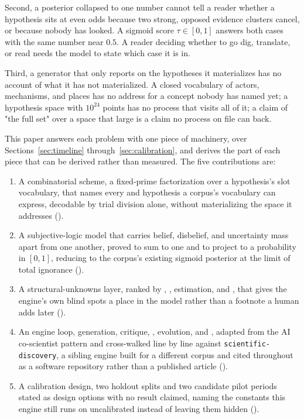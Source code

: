 \documentclass[11pt]{article}
\begin{document}
Second, a posterior collapsed to one number cannot tell a reader whether
a hypothesis sits at even odds because two strong, opposed evidence
clusters cancel, or because nobody has looked. A sigmoid score $\tau \in
[0,1]$ answers both cases with the same number near $0.5$. A reader
deciding whether to go dig, translate, or read needs the model to state
which case it is in.

Third, a generator that only reports on the hypotheses it materializes has
no account of what it has not materialized. A closed vocabulary of actors,
mechanisms, and places has no address for a concept nobody has named yet;
a hypothesis space with $10^{24}$ points has no process that visits all of
it; a claim of "the full set" over a space that large is a claim no
process on file can back.

This paper answers each problem with one piece of machinery, over
Sections~\ref{sec:timeline} through~\ref{sec:calibration}, and derives the
part of each piece that can be derived rather than measured. The five
contributions are:

\begin{enumerate}
  \item A combinatorial  scheme, a fixed-prime
    factorization over a hypothesis's slot vocabulary, that names every
     and
     hypothesis a corpus's vocabulary
    can express, decodable by trial division alone, without materializing
    the space it addresses ().
  \item A subjective-logic  model that carries
    belief, disbelief, and uncertainty mass apart from one another, proved
    to sum to one and to project to a probability in $[0,1]$, reducing to
    the corpus's existing sigmoid posterior at the limit of total ignorance
    ().
  \item A structural-unknowns layer,  ranked by
    , ,  estimation, and
    , that gives
    the engine's own blind spots a place in the model rather than a
    footnote a human adds later ().
  \item An engine loop, generation, critique, , evolution, and ,
    adapted from the AI co-scientist pattern
    \autocite{gottweis2025coscientist} and cross-walked line by line
    against \texttt{scientific-discovery}, a sibling engine built for a
    different corpus and cited throughout as a software repository
    rather than a published article ().
  \item A calibration design, two holdout splits and two candidate pilot
    periods stated as design options with no result claimed, naming the
    constants this engine still runs on uncalibrated instead of leaving
    them hidden ().
\end{enumerate}
\end{document}
